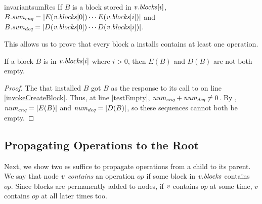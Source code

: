 \begin{restatable}{invariant}{sumRes}
\label{lem::sum}
If $B$ is a block stored in $\mbox{\textnormal{\textit{v}}}.\mbox{\textit{blocks}}[i]$,
$B.\mbox{\textit{sum\textsubscript{enq}}} = | E(\mbox{\textnormal{\textit{v}}}.\mbox{\textit{blocks}}[0])\cdots E(\mbox{\textnormal{\textit{v}}}.\mbox{\textit{blocks}}[i]) |$ and
$B.\mbox{\textit{sum\textsubscript{deq}}} = | D(\mbox{\textnormal{\textit{v}}}.\mbox{\textit{blocks}}[0])\cdots D(\mbox{\textnormal{\textit{v}}}.\mbox{\textit{blocks}}[i]) |$.
\end{restatable}

This allows us to prove that every block a  installs contains at least one operation.

\begin{corollary}\label{blockNotEmpty}
If a block $B$ is in $\mbox{\textnormal{\textit{v}}}.\mbox{\textit{blocks}}[i]$ where $i>0$, then $E(B)$ and $D(B)$ are not both empty.
\end{corollary}
\begin{proof}
The  that installed $B$ got $B$ as the response to its call to  on line \ref{invokeCreateBlock}.
Thus, at line \ref{testEmpty}, $\mbox{\textnormal{\textit{num\textsubscript{enq}}}}+\mbox{\textnormal{\textit{num\textsubscript{deq}}}}\neq 0$.
By , $\mbox{\textnormal{\textit{num\textsubscript{enq}}}} = |E(B)|$ and $\mbox{\textnormal{\textit{num\textsubscript{deq}}}} = |D(B)|$,
so these sequences cannot both be empty.
\end{proof}



\subsection{Propagating Operations to the Root}
\label{sec::propagating}

Next, we show two es suffice to propagate operations from a child to its parent.
We say that node $\mbox{\textnormal{\textit{v}}}$ \emph{contains} an operation $op$ if some block in $\mbox{\textnormal{\textit{v}}}.\mbox{\textit{blocks}}$ contains $op$.
Since blocks are permanently added to nodes, if $\mbox{\textnormal{\textit{v}}}$ contains $op$ at some time, $v$ contains $op$ at all later times too.

